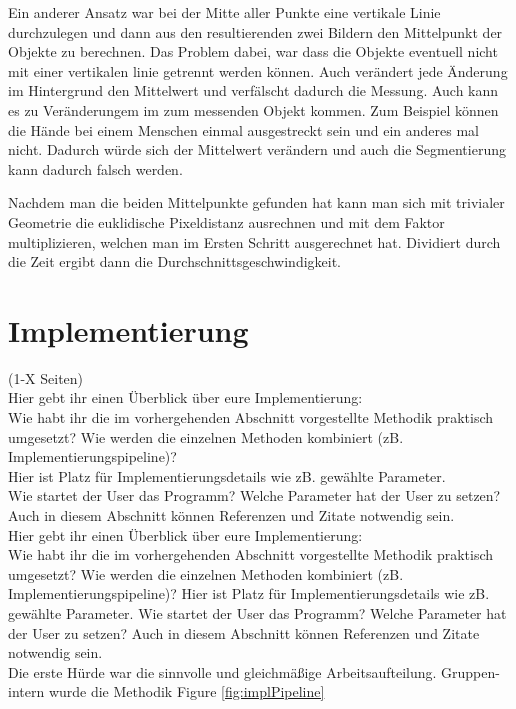 \documentclass[deutsch]{scrartcl}
\begin{document}
Ein anderer Ansatz war bei der Mitte aller Punkte eine vertikale Linie durchzulegen und dann aus den resultierenden zwei Bildern den Mittelpunkt der Objekte zu berechnen. Das Problem dabei, war dass die Objekte eventuell nicht mit einer vertikalen linie getrennt werden können. Auch verändert jede Änderung im Hintergrund den Mittelwert und verfälscht dadurch die Messung. Auch kann es zu Veränderungem im zum messenden Objekt kommen. Zum Beispiel können die Hände bei einem Menschen einmal ausgestreckt sein und ein anderes mal nicht. Dadurch würde sich der Mittelwert verändern und auch die Segmentierung kann dadurch falsch werden.

Nachdem man die beiden Mittelpunkte gefunden hat kann man sich mit trivialer Geometrie die euklidische Pixeldistanz ausrechnen und mit dem Faktor multiplizieren, welchen man im Ersten Schritt ausgerechnet hat. Dividiert durch die Zeit ergibt dann die Durchschnittsgeschwindigkeit.


\section{Implementierung}
(1-X Seiten)\\
Hier gebt ihr einen Überblick über eure Implementierung:\\
Wie habt ihr die im vorhergehenden Abschnitt vorgestellte Methodik praktisch umgesetzt? Wie werden die einzelnen Methoden kombiniert (zB. Implementierungspipeline)?\\
Hier ist Platz für Implementierungsdetails wie zB. gewählte Parameter. \\
Wie startet der User das Programm? Welche Parameter hat der User zu setzen?\\
Auch in diesem Abschnitt können Referenzen und Zitate notwendig sein.\\

Hier gebt ihr einen Überblick über eure Implementierung:\\
Wie habt ihr die im vorhergehenden Abschnitt vorgestellte Methodik praktisch umgesetzt? Wie werden die einzelnen Methoden kombiniert (zB. Implementierungspipeline)?
Hier ist Platz für Implementierungsdetails wie zB. gewählte Parameter.
Wie startet der User das Programm? Welche Parameter hat der User zu setzen?
Auch in diesem Abschnitt können Referenzen und Zitate notwendig sein.\\

Die erste Hürde war die sinnvolle und gleichmäßige Arbeitsaufteilung. Gruppen-intern wurde die Methodik Figure \ref{fig:implPipeline}
\end{document}
